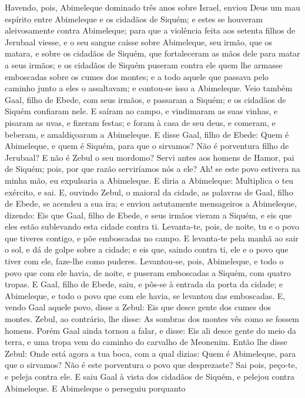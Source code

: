 Havendo, pois, Abimeleque dominado três anos sobre Israel,
enviou Deus um mau espírito entre Abimeleque e os cidadãos de
Siquém; e estes se houveram aleivosamente contra Abimeleque;
para que a violência feita aos setenta filhos de Jerubaal
viesse, e o seu sangue caísse sobre Abimeleque, seu irmão, que os
matara, e sobre os cidadãos de Siquém, que fortaleceram as mãos dele
para matar a seus irmãos; e os cidadãos de Siquém puseram
contra ele quem lhe armasse emboscadas sobre os cumes dos montes; e
a todo aquele que passava pelo caminho junto a eles o assaltavam; e
contou-se isso a Abimeleque. Veio também Gaal, filho de
Ebede, com seus irmãos, e passaram a Siquém; e os cidadãos de Siquém
confiaram nele. E saíram ao campo, e vindimaram as suas
vinhas, e pisaram as uvas, e fizeram festas; e foram à casa de seu
deus, e comeram, e beberam, e amaldiçoaram a Abimeleque. E
disse Gaal, filho de Ebede: Quem é Abimeleque, e quem é Siquém, para
que o sirvamos? Não é porventura filho de Jerubaal? E não é Zebul o
seu mordomo? Servi antes aos homens de Hamor, pai de Siquém; pois,
por que razão serviríamos nós a ele? Ah! se este povo
estivera na minha mão, eu expulsaria a Abimeleque. E diria a
Abimeleque: Multiplica o teu exército, e sai. E, ouvindo
Zebul, o maioral da cidade, as palavras de Gaal, filho de Ebede, se
acendeu a sua ira; e enviou astutamente mensageiros a
Abimeleque, dizendo: Eis que Gaal, filho de Ebede, e seus irmãos
vieram a Siquém, e eis que eles estão sublevando esta cidade contra
ti. Levanta-te, pois, de noite, tu e o povo que tiveres
contigo, e põe emboscadas no campo. E levanta-te pela manhã
ao sair o sol, e dá de golpe sobre a cidade; e eis que, saindo
contra ti, ele e o povo que tiver com ele, faze-lhe como puderes.
Levantou-se, pois, Abimeleque, e todo o povo que com ele
havia, de noite, e puseram emboscadas a Siquém, com quatro tropas.
E Gaal, filho de Ebede, saiu, e pôs-se à entrada da porta da
cidade; e Abimeleque, e todo o povo que com ele havia, se levantou
das emboscadas. E, vendo Gaal aquele povo, disse a Zebul: Eis
que desce gente dos cumes dos montes. Zebul, ao contrário, lhe
disse: As sombras dos montes vês como se fossem homens. Porém
Gaal ainda tornou a falar, e disse: Eis ali desce gente do meio da
terra, e uma tropa vem do caminho do carvalho de Meonenim.
Então lhe disse Zebul: Onde está agora a tua boca, com a qual
dizias: Quem é Abimeleque, para que o sirvamos? Não é este
porventura o povo que desprezaste? Sai pois, peço-te, e peleja
contra ele. E saiu Gaal à vista dos cidadãos de Siquém, e
pelejou contra Abimeleque. E Abimeleque o perseguiu porquanto
